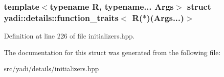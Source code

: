 \subsubsection*{template$<$typename R, typename... Args$>$\newline
struct yadi\+::details\+::function\+\_\+traits$<$ R($\ast$)(\+Args...)$>$}



Definition at line 226 of file initializers.\+hpp.



The documentation for this struct was generated from the following file\+:\begin{DoxyCompactItemize}
\item 
src/yadi/details/initializers.\+hpp\end{DoxyCompactItemize}
